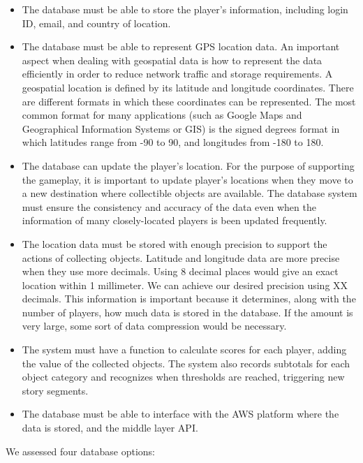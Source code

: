 \documentclass[conference]{IEEEtran}
\begin{document}
\begin{itemize}

\item The database must be able to store the player’s information, including login ID, email, and country of location.
\item The database must be able to represent GPS location data. An important aspect when dealing with geospatial data is how to represent the data efficiently in order to reduce network traffic and storage requirements. A geospatial location is defined by its latitude and longitude coordinates. There are different formats in which these coordinates can be represented. The most common format for many applications (such as Google Maps and Geographical Information Systems or GIS) is the signed degrees format in which latitudes range from -90 to 90, and longitudes from -180 to 180.
\item The database can update the player's location. For the purpose of supporting the gameplay, it is important to update player’s locations when they move to a new destination where collectible objects are available. The database system must ensure the consistency and accuracy of the data even when the information of many closely-located players is been updated frequently. 
\item The location data must be stored with enough precision to support the actions of collecting objects. Latitude and longitude data are more precise when they use more decimals. Using 8 decimal places would give an exact location within 1 millimeter. We can achieve our desired precision using XX decimals. This information is important because it determines, along with the number of players, how much data is stored in the database. If the amount is very large, some sort of data compression would be necessary.
\item The system must have a function to calculate scores for each player, adding the value of the collected objects. The system also records subtotals for each object category and recognizes when thresholds are reached, triggering new story segments.
\item The database must be able to interface with the AWS platform where the data is stored, and the middle layer API.

\end{itemize}

We assessed four database options:
\end{document}
